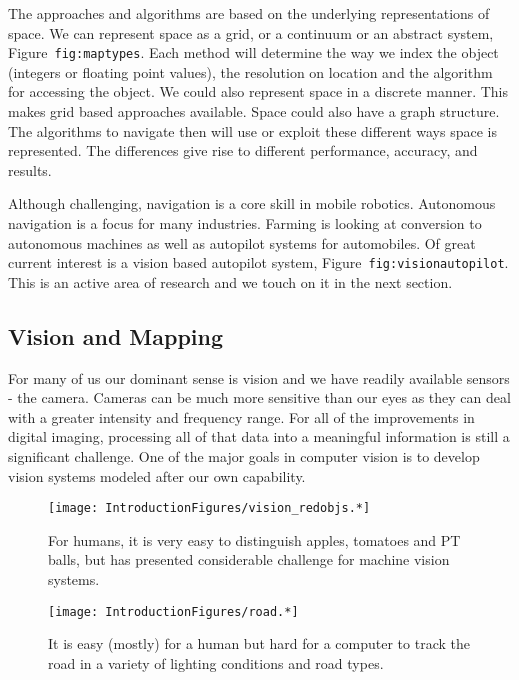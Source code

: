 The approaches and algorithms are based on the underlying
representations of space. We can represent space as a grid, or a
continuum or an abstract system, Figure~\texttt{fig:maptypes}. Each
method will determine the way we index the object (integers or floating
point values), the resolution on location and the algorithm for
accessing the object. We could also represent space in a discrete
manner. This makes grid based approaches available. Space could also
have a graph structure. The algorithms to navigate then will use or
exploit these different ways space is represented. The differences give
rise to different performance, accuracy, and results.

Although challenging, navigation is a core skill in mobile robotics.
Autonomous navigation is a focus for many industries. Farming is looking
at conversion to autonomous machines as well as autopilot systems for
automobiles. Of great current interest is a vision based autopilot
system, Figure~\texttt{fig:visionautopilot}. This is an active area of
research and we touch on it in the next section.

\hypertarget{vision-and-mapping}{%
\subsection{Vision and Mapping}\label{vision-and-mapping}}

For many of us our dominant sense is vision and we have readily
available sensors - the camera. Cameras can be much more sensitive than
our eyes as they can deal with a greater intensity and frequency range.
For all of the improvements in digital imaging, processing all of that
data into a meaningful information is still a significant challenge. One
of the major goals in computer vision is to develop vision systems
modeled after our own capability.

\begin{figure}
\centering
\texttt{[image: IntroductionFigures/vision\_redobjs.*]}
\caption{For humans, it is very easy to distinguish apples, tomatoes and
PT balls, but has presented considerable challenge for machine vision
systems.}
\end{figure}

\begin{figure}
\centering
\texttt{[image: IntroductionFigures/road.*]}
\caption{It is easy (mostly) for a human but hard for a computer to
track the road in a variety of lighting conditions and road types.}
\end{figure}

